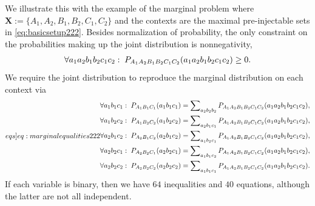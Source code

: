 \documentclass[aps,english,superscriptaddress,onecolumn,twoside,longbibliography,pra,floatfix,fleqn,nofootinbib]{revtex4-1}%
\theoremstyle{definition}
\newcommand{\p}[2][]{{P_{#1}}\parenths{#2}}
\DeclarePairedDelimiter{\parenths}{\lparen}{\rparen}
\begin{document}
 We illustrate this with the example of the marginal problem where $\bm{X} := \{ A_1, A_2, B_1, B_2, C_1, C_2\}$ and the contexts are the 
maximal pre-injectable sets in \cref{eq:basicsetup222}.
Besides normalization of probability, the only constraint on the probabilities making up the joint distribution is nonnegativity,
\begin{align}\label{eq:nonnegativity}
\forall{a_1 a_2 b_1 b_2 c_1 c_2}:\; \p[A_1 A_2 B_1 B_2 C_1 C_2]{a_1 a_2 b_1 b_2 c_1 c_2} \geq 0.
\end{align}
We require the joint distribution to reproduce the marginal distribution on each context via
\begin{align}\label[eqs]{eq:marginalequalities222}
\begin{split}
&\forall{a_1 b_1 c_1}:\;\p[A_1 B_1 C_1]{a_1 b_1 c_1} = \sum\nolimits_{a_2 b_2 b_2}\p[A_1 A_2 B_1 B_2 C_1 C_2]{a_1 a_2 b_1 b_2 c_1 c_2},\\
&\forall{a_1 b_2 c_2}:\;\p[A_1 B_2 C_2]{a_1 b_2 c_2} = \sum\nolimits_{a_2 b_1 c_1}\p[A_1 A_2 B_1 B_2 C_1 C_2]{a_1 a_2 b_1 b_2 c_1 c_2},\\
&\forall{a_2 b_1 c_2}:\;\p[A_2 B_1 C_2]{a_2 b_1 c_2} = \sum\nolimits_{a_1 b_2 c_1}\p[A_1 A_2 B_1 B_2 C_1 C_2]{a_1 a_2 b_1 b_2 c_1 c_2},\\
&\forall{a_2 b_2 c_1}:\;\p[A_2 B_2 C_1]{a_2 b_2 c_1} = \sum\nolimits_{a_1 b_1 c_2}\p[A_1 A_2 B_1 B_2 C_1 C_2]{a_1 a_2 b_1 b_2 c_1 c_2},\\
&\forall{a_2 b_2 c_2}:\;\p[A_2 B_2 C_2]{a_2 b_2 c_2} = \sum\nolimits_{a_1 b_1 c_1}\p[A_1 A_2 B_1 B_2 C_1 C_2]{a_1 a_2 b_1 b_2 c_1 c_2}.
\end{split}
\end{align}
If each variable is binary, then we have $64$ inequalities and $40$ equations, although the latter are not all independent. 
\end{document}
